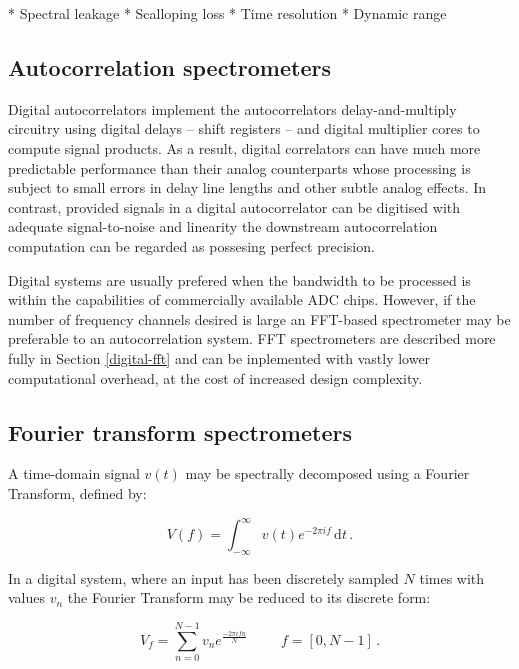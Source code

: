 \documentclass{ws-rv961x669}
\begin{document}
* Spectral leakage
* Scalloping loss
* Time resolution
* Dynamic range

\subsection{Autocorrelation spectrometers}\label{sub:acs}

Digital autocorrelators implement the autocorrelators delay-and-multiply circuitry using digital delays -- shift registers -- and digital multiplier cores to compute signal products. As a result, digital correlators can have much more predictable performance than their analog counterparts whose processing is subject to small errors in delay line lengths and other subtle analog effects. In contrast, provided signals in a digital autocorrelator can be digitised with adequate signal-to-noise and linearity the downstream autocorrelation computation can be regarded as possesing perfect precision.

Digital systems are usually prefered when the bandwidth to be processed is within the capabilities of commercially available ADC chips. However, if the number of frequency channels desired is large an FFT-based spectrometer may be preferable to an autocorrelation system. FFT spectrometers are described more fully in Section \ref{digital-fft} and can be inplemented with vastly lower computational overhead, at the cost of increased design complexity.

\subsection{Fourier transform spectrometers}\label{sub:ftf}

A time-domain signal $v(t)$ may be spectrally decomposed using a Fourier Transform, defined by:

\begin{equation}
 \label{ft}
 V(f) = \int_{-\infty}^{\infty} v(t) e^{-2\pi i f} \,\mathrm{d}t\, .
\end{equation}

In a digital system, where an input has been discretely sampled $N$ times with values $v_n$ the Fourier Transform may be reduced to its discrete form: 

\begin{equation}
 \label{dft}
 V_f = \sum_{n = 0}^{N-1} v_n e^{\frac{-2\pi i f n}{N}} \hspace{1cm} f = [0, N-1]\,.
\end{equation}
\end{document}
